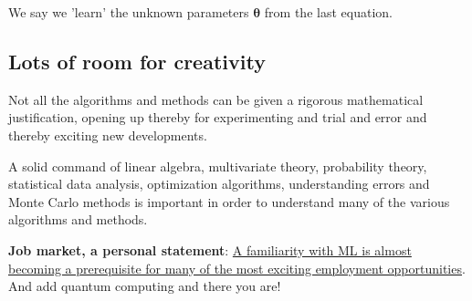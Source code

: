 \documentclass[%
oneside,                 %
final,                   %
10pt]{article}
\begin{document}
We say we 'learn' the unknown parameters $\bm{\theta}$ from the last equation.

\subsection{Lots of room for creativity}
\begin{block}{}
Not all the
algorithms and methods can be given a rigorous mathematical
justification, opening up thereby for experimenting
and trial and error and thereby exciting new developments. 
\end{block}

\begin{block}{}
A solid command of linear algebra, multivariate theory, 
probability theory, statistical data analysis, optimization algorithms, 
understanding errors and Monte Carlo methods is important in order to understand many of the 
various algorithms and methods. 
\end{block}

\textbf{Job market, a personal statement}: \href{{https://www.analyticsindiamag.com/top-countries-hiring-most-number-of-artificial-intelligence-machine-learning-experts/}}{A familiarity with ML is almost becoming a prerequisite for many of the most exciting employment opportunities}. And add quantum computing and there you are!

\end{document}
